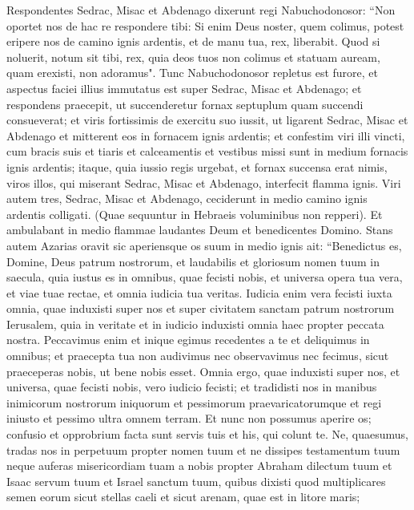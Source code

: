\begin{biblechapter}
\verse Respondentes Sedrac, Misac et Abdenago dixerunt regi Nabuchodonosor: “Non oportet nos de hac re respondere tibi: 
\verse Si enim Deus noster, quem colimus, potest eripere nos de camino ignis ardentis, et de manu tua, rex, liberabit.  
\verse Quod si noluerit, notum sit tibi, rex, quia deos tuos non colimus et statuam auream, quam erexisti, non adoramus". 
\verse Tunc Nabuchodonosor repletus est furore, et aspectus faciei illius immutatus est super Sedrac, Misac et Abdenago; et respondens praecepit, ut succenderetur fornax septuplum quam succendi consueverat; 
\verse et viris fortissimis de exercitu suo iussit, ut ligarent Sedrac, Misac et Abdenago et mitterent eos in fornacem ignis ardentis; 
\verse et confestim viri illi vincti, cum bracis suis et tiaris et calceamentis et vestibus missi sunt in medium fornacis ignis ardentis; 
\verse itaque, quia iussio regis urgebat, et fornax succensa erat nimis, viros illos, qui miserant Sedrac, Misac et Abdenago, interfecit flamma ignis. 
\verse Viri autem tres, Sedrac, Misac et Abdenago, ceciderunt in medio camino ignis ardentis colligati. (Quae sequuntur in Hebraeis voluminibus non repperi). 
\verse Et ambulabant in medio flammae laudantes Deum et benedicentes Domino. 
\verse Stans autem Azarias oravit sic aperiensque os suum in medio ignis ait: 
\verse “Benedictus es, Domine, Deus patrum nostrorum, et laudabilis et gloriosum nomen tuum in saecula, 
\verse quia iustus es in omnibus, quae fecisti nobis, et universa opera tua vera, et viae tuae rectae, et omnia iudicia tua veritas. 
\verse Iudicia enim vera fecisti iuxta omnia, quae induxisti super nos et super civitatem sanctam patrum nostrorum Ierusalem, quia in veritate et in iudicio induxisti omnia haec propter peccata nostra. 
\verse Peccavimus enim et inique egimus recedentes a te et deliquimus in omnibus; 
\verse et praecepta tua non audivimus nec observavimus nec fecimus, sicut praeceperas nobis, ut bene nobis esset. 
\verse Omnia ergo, quae induxisti super nos, et universa, quae fecisti nobis, vero iudicio fecisti; 
\verse et tradidisti nos in manibus inimicorum nostrorum iniquorum et pessimorum praevaricatorumque et regi iniusto et pessimo ultra omnem terram. 
\verse Et nunc non possumus aperire os; confusio et opprobrium facta sunt servis tuis et his, qui colunt te. 
\verse Ne, quaesumus, tradas nos in perpetuum propter nomen tuum et ne dissipes testamentum tuum 
\verse neque auferas misericordiam tuam a nobis propter Abraham dilectum tuum et Isaac servum tuum et Israel sanctum tuum, 
\verse quibus dixisti quod multiplicares semen eorum sicut stellas caeli et sicut arenam, quae est in litore maris; 

\end{biblechapter}
